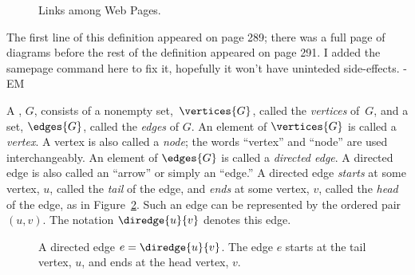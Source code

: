\iffalse

and in the following graph the vertices $x_1, \ldots, x_n$ correspond
to web pages and $\diredge{x_i}{x_j}$ is a directed edge when page
$x_i$ contains a hyperlink to page $x_j$.
\fi


\begin{figure}


\caption{Links among Web Pages.}

\label{webpage-links}

\end{figure}
\begin{editingnotes}

The first line of this definition appeared on page 289; there was a
full page of diagrams before the rest of the definition appeared on
page 291. I added the samepage command here to fix it, hopefully it
won't have uninteded side-effects. -EM
\end{editingnotes}

\begin{samepage}
\begin{definition}\label{graphdef}
  A , $G$, consists of a nonempty
  set,~$\vertices{G}$, called the \emph{vertices}%
of~$G$, and a set, $\edges{G}$, called the \emph{edges}%
of $G$.  An element of
  $\vertices{G}$ is called a \emph{vertex}.  A vertex is also called a
  \emph{node}; the words ``vertex'' and ``node'' are used
  interchangeably.  An element of $\edges{G}$ is called a
  \emph{directed edge}.  A directed edge is also called an ``arrow''
  or simply an ``edge.''  A directed edge \emph{starts} 
at some vertex, $u$, called the \emph{tail}
  of the edge, and \emph{ends} at some vertex,
  $v$, called the \emph{head} of the edge, as in Figure~\ref{fig:6EA}.
  Such an edge can be represented by the ordered pair $(u,v)$.  The
  notation $\diredge{u}{v}$ denotes this edge.
\end{definition}
\end{samepage}

\begin{figure}


\caption{A directed edge $e = \diredge{u}{v}$.  The edge $e$ starts at
  the tail vertex, $u$, and ends at the head vertex, $v$.}

\label{fig:6EA}
\end{figure}

